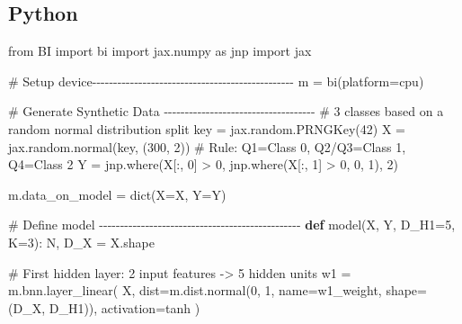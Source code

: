 \documentclass[
  letterpaper,
  DIV=11,
  numbers=noendperiod]{scrartcl}
\newenvironment{Shaded}{\begin{snugshade}}{\end{snugshade}}
\newcommand{\BuiltInTok}[1]{\textcolor[rgb]{0.00,0.23,0.31}{#1}}
\newcommand{\CommentTok}[1]{\textcolor[rgb]{0.37,0.37,0.37}{#1}}
\newcommand{\DecValTok}[1]{\textcolor[rgb]{0.68,0.00,0.00}{#1}}
\newcommand{\ImportTok}[1]{\textcolor[rgb]{0.00,0.46,0.62}{#1}}
\newcommand{\KeywordTok}[1]{\textcolor[rgb]{0.00,0.23,0.31}{\textbf{#1}}}
\newcommand{\NormalTok}[1]{\textcolor[rgb]{0.00,0.23,0.31}{#1}}
\newcommand{\OperatorTok}[1]{\textcolor[rgb]{0.37,0.37,0.37}{#1}}
\newcommand{\StringTok}[1]{\textcolor[rgb]{0.13,0.47,0.30}{#1}}
\begin{document}
\subsection{Python}

\begin{Shaded}
\begin{Highlighting}[]
\ImportTok{from}\NormalTok{ BI }\ImportTok{import}\NormalTok{ bi}
\ImportTok{import}\NormalTok{ jax.numpy }\ImportTok{as}\NormalTok{ jnp}
\ImportTok{import}\NormalTok{ jax}

\CommentTok{\# Setup device{-}{-}{-}{-}{-}{-}{-}{-}{-}{-}{-}{-}{-}{-}{-}{-}{-}{-}{-}{-}{-}{-}{-}{-}{-}{-}{-}{-}{-}{-}{-}{-}{-}{-}{-}{-}{-}{-}{-}{-}{-}{-}{-}{-}{-}{-}{-}{-}}
\NormalTok{m }\OperatorTok{=}\NormalTok{ bi(platform}\OperatorTok{=}\StringTok{\textquotesingle{}cpu\textquotesingle{}}\NormalTok{)}

\CommentTok{\# Generate Synthetic Data {-}{-}{-}{-}{-}{-}{-}{-}{-}{-}{-}{-}{-}{-}{-}{-}{-}{-}{-}{-}{-}{-}{-}{-}{-}{-}{-}{-}{-}{-}{-}{-}{-}{-}{-}{-}}
\CommentTok{\# 3 classes based on a random normal distribution split}
\NormalTok{key }\OperatorTok{=}\NormalTok{ jax.random.PRNGKey(}\DecValTok{42}\NormalTok{)}
\NormalTok{X }\OperatorTok{=}\NormalTok{ jax.random.normal(key, (}\DecValTok{300}\NormalTok{, }\DecValTok{2}\NormalTok{))}
\CommentTok{\# Rule: Q1=Class 0, Q2/Q3=Class 1, Q4=Class 2}
\NormalTok{Y }\OperatorTok{=}\NormalTok{ jnp.where(X[:, }\DecValTok{0}\NormalTok{] }\OperatorTok{\textgreater{}} \DecValTok{0}\NormalTok{, jnp.where(X[:, }\DecValTok{1}\NormalTok{] }\OperatorTok{\textgreater{}} \DecValTok{0}\NormalTok{, }\DecValTok{0}\NormalTok{, }\DecValTok{1}\NormalTok{), }\DecValTok{2}\NormalTok{)}

\NormalTok{m.data\_on\_model }\OperatorTok{=} \BuiltInTok{dict}\NormalTok{(X}\OperatorTok{=}\NormalTok{X, Y}\OperatorTok{=}\NormalTok{Y)}

\CommentTok{\# Define model {-}{-}{-}{-}{-}{-}{-}{-}{-}{-}{-}{-}{-}{-}{-}{-}{-}{-}{-}{-}{-}{-}{-}{-}{-}{-}{-}{-}{-}{-}{-}{-}{-}{-}{-}{-}{-}{-}{-}{-}{-}{-}{-}{-}{-}{-}{-}{-}}
\KeywordTok{def}\NormalTok{ model(X, Y, D\_H1}\OperatorTok{=}\DecValTok{5}\NormalTok{, K}\OperatorTok{=}\DecValTok{3}\NormalTok{):}
\NormalTok{    N, D\_X }\OperatorTok{=}\NormalTok{ X.shape}
    
    \CommentTok{\# First hidden layer: 2 input features {-}\textgreater{} 5 hidden units}
\NormalTok{    w1 }\OperatorTok{=}\NormalTok{ m.bnn.layer\_linear(}
\NormalTok{        X, }
\NormalTok{        dist}\OperatorTok{=}\NormalTok{m.dist.normal(}\DecValTok{0}\NormalTok{, }\DecValTok{1}\NormalTok{, name}\OperatorTok{=}\StringTok{\textquotesingle{}w1\_weight\textquotesingle{}}\NormalTok{, shape}\OperatorTok{=}\NormalTok{(D\_X, D\_H1)),}
\NormalTok{        activation}\OperatorTok{=}\StringTok{\textquotesingle{}tanh\textquotesingle{}}
\NormalTok{    )}
    

\end{Highlighting}
\end{Shaded}
\end{document}
